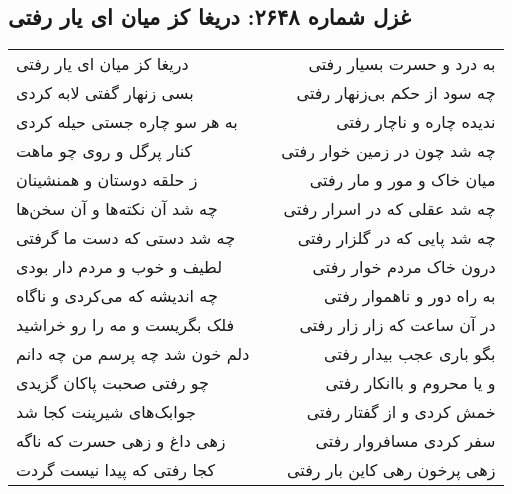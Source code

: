 \begin{center}
\section*{غزل شماره ۲۶۴۸: دریغا کز میان ای یار رفتی}
\label{sec:2648}
\begin{longtable}{l p{0.5cm} r}
دریغا کز میان ای یار رفتی
&&
به درد و حسرت بسیار رفتی
\\
بسی زنهار گفتی لابه کردی
&&
چه سود از حکم بی‌زنهار رفتی
\\
به هر سو چاره جستی حیله کردی
&&
ندیده چاره و ناچار رفتی
\\
کنار پرگل و روی چو ماهت
&&
چه شد چون در زمین خوار رفتی
\\
ز حلقه دوستان و همنشینان
&&
میان خاک و مور و مار رفتی
\\
چه شد آن نکته‌ها و آن سخن‌ها
&&
چه شد عقلی که در اسرار رفتی
\\
چه شد دستی که دست ما گرفتی
&&
چه شد پایی که در گلزار رفتی
\\
لطیف و خوب و مردم دار بودی
&&
درون خاک مردم خوار رفتی
\\
چه اندیشه که می‌کردی و ناگاه
&&
به راه دور و ناهموار رفتی
\\
فلک بگریست و مه را رو خراشید
&&
در آن ساعت که زار زار رفتی
\\
دلم خون شد چه پرسم من چه دانم
&&
بگو باری عجب بیدار رفتی
\\
چو رفتی صحبت پاکان گزیدی
&&
و یا محروم و باانکار رفتی
\\
جوابک‌های شیرینت کجا شد
&&
خمش کردی و از گفتار رفتی
\\
زهی داغ و زهی حسرت که ناگه
&&
سفر کردی مسافروار رفتی
\\
کجا رفتی که پیدا نیست گردت
&&
زهی پرخون رهی کاین بار رفتی
\\
\end{longtable}
\end{center}
